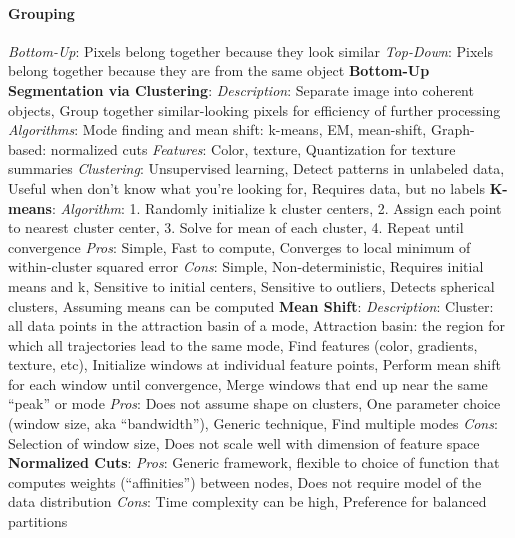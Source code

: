 \documentclass{article}
\begin{document}
\begin{multicols*}{2}
        \paragraph*{Grouping}
        \textit{Bottom-Up}: Pixels belong together because they look similar\newline
        \textit{Top-Down}: Pixels belong together because they are from the same object\newline
        \textbf{Bottom-Up Segmentation via Clustering}:\newline
        \textit{Description}: Separate image into coherent objects, Group together similar-looking pixels for
        efficiency of further processing\newline
        \textit{Algorithms}: Mode finding and mean shift: k-means, EM, mean-shift, Graph-based: normalized cuts\newline
        \textit{Features}: Color, texture, Quantization for texture summaries\newline
        \textit{Clustering}: Unsupervised learning, Detect patterns in unlabeled data, Useful when don’t know what
        you’re looking for, Requires data, but no labels\newline
        \textbf{K-means}:\newline
        \textit{Algorithm}: 1. Randomly initialize k cluster centers, 2. Assign each point to nearest cluster center,
        3. Solve for mean of each cluster, 4. Repeat until convergence\newline
        \textit{Pros}: Simple, Fast to compute, Converges to local minimum of within-cluster squared error
        \textit{Cons}: Simple, Non-deterministic, Requires initial means and k, Sensitive to initial centers, Sensitive
        to outliers, Detects spherical clusters, Assuming means can be computed\newline
        \textbf{Mean Shift}:\newline
        \textit{Description}: Cluster: all data points in the attraction basin of a mode, Attraction basin: the
        region for which all trajectories lead to the same mode, Find features (color, gradients, texture, etc),
        Initialize windows at individual feature points, Perform mean shift for each window until convergence, Merge
        windows that end up near the same “peak” or mode\newline
        \textit{Pros}: Does not assume shape on clusters, One parameter choice (window size, aka “bandwidth”), Generic
        technique, Find multiple modes\newline
        \textit{Cons}: Selection of window size, Does not scale well with dimension of feature space\newline
        \textbf{Normalized Cuts}:\newline
        \textit{Pros}: Generic framework, flexible to choice of function that computes weights (“affinities”) between
        nodes, Does not require model of the data distribution\newline
        \textit{Cons}: Time complexity can be high, Preference for balanced partitions

\end{multicols*}
\end{document}
